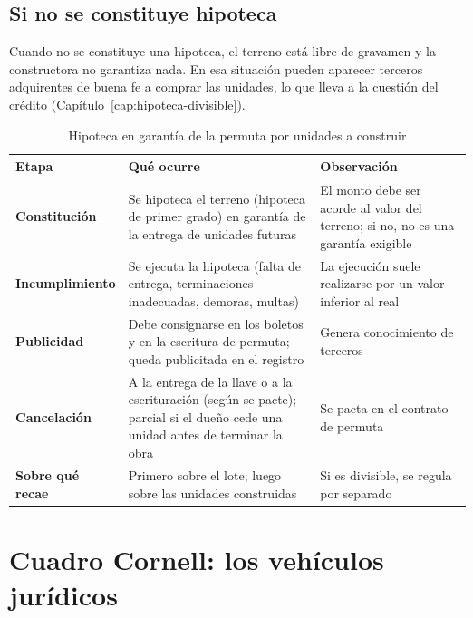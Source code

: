 \documentclass[12pt,oneside]{book}
\begin{document}
\subsection{Si no se constituye hipoteca}

Cuando no se constituye una hipoteca, el terreno está libre de gravamen y la constructora no garantiza nada. En esa situación pueden aparecer terceros adquirentes de buena fe a comprar las unidades, lo que lleva a la cuestión del crédito (Capítulo~\ref{cap:hipoteca-divisible}).

\begin{table}[H]
\centering
\small
\begin{tabularx}{\textwidth}{>{\raggedright\arraybackslash}p{2.6cm}YY}
\toprule
\textbf{Etapa} & \textbf{Qué ocurre} & \textbf{Observación} \\
\midrule
\textbf{Constitución} & Se hipoteca el terreno (hipoteca de primer grado) en garantía de la entrega de unidades futuras & El monto debe ser acorde al valor del terreno; si no, no es una garantía exigible \\
\addlinespace
\textbf{Incumplimiento} & Se ejecuta la hipoteca (falta de entrega, terminaciones inadecuadas, demoras, multas) & La ejecución suele realizarse por un valor inferior al real \\
\addlinespace
\textbf{Publicidad} & Debe consignarse en los boletos y en la escritura de permuta; queda publicitada en el registro & Genera conocimiento de terceros \\
\addlinespace
\textbf{Cancelación} & A la entrega de la llave o a la escrituración (según se pacte); parcial si el dueño cede una unidad antes de terminar la obra & Se pacta en el contrato de permuta \\
\addlinespace
\textbf{Sobre qué recae} & Primero sobre el lote; luego sobre las unidades construidas & Si es divisible, se regula por separado \\
\bottomrule
\end{tabularx}
\caption{Hipoteca en garantía de la permuta por unidades a construir}
\end{table}

\section{Cuadro Cornell: los vehículos jurídicos}
\end{document}
